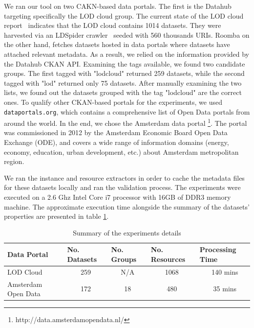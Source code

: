 \documentclass[runningheads,a4paper]{llncs}
\begin{document}
We ran our tool on two CAKN-based data portals. The first is the Datahub targeting specifically the LOD cloud group. The current state of the LOD cloud report~\cite{DBLP:conf/semweb/SchmachtenbergBP14} indicates that the LOD cloud contains 1014 datasets. They were harvested via an LDSpider crawler~\cite{conf/semweb/IseleUBH10} seeded with 560 thousands URIs. Roomba on the other hand, fetches datasets hosted in data portals where datasets have attached relevant metadata. As a result, we relied on the information provided by the Datahub CKAN API. Examining the tags available, we found two candidate groups. The first tagged with "lodcloud" returned 259 datasets, while the second tagged with "lod" returned only 75 datasets. After manually examining the two lists, we found out the datasets grouped with the tag "lodcloud" are the correct ones. To qualify other CKAN-based portals for the experiments, we used \texttt{dataportals.org}, which contains a comprehensive list of Open Data portals from around the world. In the end, we chose the Amsterdam data portal \footnote{http://data.amsterdamopendata.nl/}. The portal was commissioned in 2012 by the Amsterdam Economic Board Open Data Exchange (ODE), and covers a wide range of information domains (energy, economy, education, urban development, etc.) about Amsterdam metropolitan region.

We ran the instance and resource extractors in order to cache the metadata files for these datasets locally and ran the validation process. The experiments were executed on a 2.6 Ghz Intel Core i7 processor with 16GB of DDR3 memory machine. The approximate execution time alongside  the summary of the datasets' properties are presented in table \ref{tab:dataportals}.

\begin{table}[ht]
\centering
\begin{tabular}{|l|c|c|c|c|}
\hline
Data Portal         & \multicolumn{1}{l|}{No. Datasets} & \multicolumn{1}{l|}{No. Groups} & \multicolumn{1}{l|}{No. Resources} & \multicolumn{1}{l|}{Processing Time} \\ \hline
LOD Cloud           & 259                               & N/A                            & 1068                               & ~140 mins                            \\ \hline
Amsterdam Open Data & 172                               & 18                             & 480                                & ~35 mins                             \\ \hline
\end{tabular}
\caption{Summary of the experiments details}
\label{tab:dataportals}
\end{table}
\end{document}
